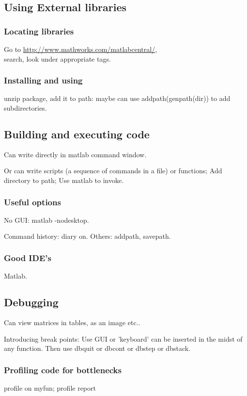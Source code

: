 \documentclass[oneside, article]{memoir}
\begin{document}
\subsection{Using External libraries}
\subsubsection{Locating libraries}
Go to \url{http://www.mathworks.com/matlabcentral/}, \\ search, look under appropriate tags.

\subsubsection{Installing and using}
unzip package, add it to path: maybe can use addpath(genpath(dir)) to add subdirectories.


\subsection{Building and executing code}
Can write directly in matlab command window.

Or can write scripts (a sequence of commands in a file) or functions; Add directory to path; Use matlab to invoke.

\subsubsection{Useful options}
No GUI: matlab -nodesktop.

Command history: diary on. Others: addpath, savepath.

\subsubsection{Good IDE's}
Matlab.

\subsection{Debugging}
Can view matrices in tables, as an image etc..

Introducing break points: Use GUI or 'keyboard' can be inserted in the midst of any function. Then use dbquit or dbcont or dbstep or dbstack.

\subsubsection{Profiling code for bottlenecks}
profile on
myfun;
profile report
\end{document}
